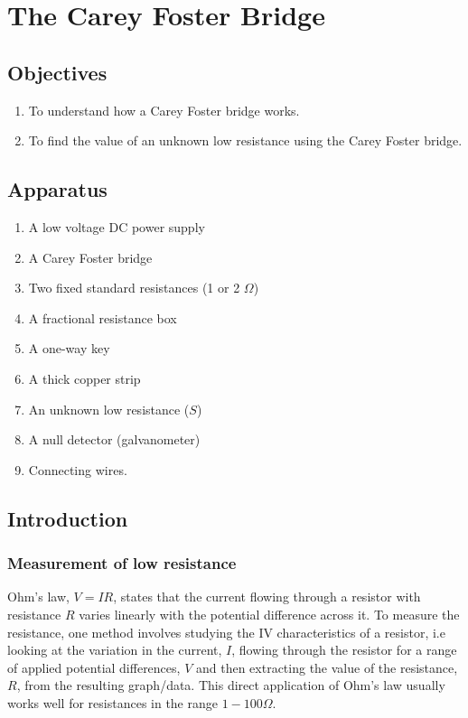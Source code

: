 \chapter{The Carey Foster Bridge}

\section*{Objectives}

\begin{enumerate}
\item To understand how a Carey Foster bridge works.
\item To find the value of an unknown low resistance using the Carey Foster bridge.
\end{enumerate}

\section*{Apparatus}

\begin{enumerate}[label=\arabic*)]
\itemsep0em
\item A low voltage DC power supply
\item A Carey Foster bridge
\item Two fixed standard resistances (1 or 2 $\Omega$)
\item A fractional resistance box
\item A one-way key
\item A thick copper strip
\item An unknown low resistance ($S$)
\item A null detector (galvanometer)
\item Connecting wires.
\end{enumerate}

\section*{Introduction}
\subsection*{Measurement of low resistance} 
Ohm's law, $V=IR$, states that the current flowing through a resistor with resistance $R$ varies linearly with the potential difference across it.
To measure the resistance, one method involves studying the IV characteristics of a resistor, i.e looking at the variation in the current, $I$, flowing through the resistor for a range of applied potential differences, $V$ and then extracting the value of the resistance, $R$, from the resulting graph/data. This direct application of Ohm's law usually works well for resistances in the range $1-100 \Omega$. 

